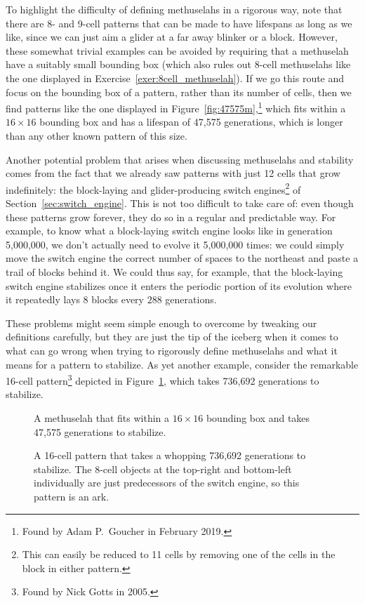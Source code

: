 To highlight the difficulty of defining methuselahs in a rigorous way, note that there are 8- and 9-cell patterns that can be made to have lifespans as long as we like, since we can just aim a glider at a far away blinker or a block. However, these somewhat trivial examples can be avoided by requiring that a methuselah have a suitably small bounding box (which also rules out $8$-cell methuselahs like the one displayed in Exercise~\ref{exer:8cell_methuselah}). If we go this route and focus on the bounding box of a pattern, rather than its number of cells, then we find patterns like the one displayed in Figure~\ref{fig:47575m},\footnote{Found by Adam P.~Goucher in February 2019.} which fits within a $16 \times 16$ bounding box and has a lifespan of 47,575 generations, which is longer than any other known pattern of this size.

Another potential problem that arises when discussing methuselahs and stability comes from the fact that we already saw patterns with just 12 cells that grow indefinitely: the block-laying and glider-producing switch engines\footnote{This can easily be reduced to 11 cells by removing one of the cells in the block in either pattern.} of Section~\ref{sec:switch_engine}. This is not too difficult to take care of: even though these patterns grow forever, they do so in a regular and predictable way. For example, to know what a block-laying switch engine looks like in generation 5,000,000, we don't actually need to evolve it 5,000,000 times: we could simply move the switch engine the correct number of spaces to the northeast and paste a trail of blocks behind it. We could thus say, for example, that the block-laying switch engine stabilizes once it enters the periodic portion of its evolution where it repeatedly lays $8$ blocks every $288$ generations.

These problems might seem simple enough to overcome by tweaking our definitions carefully, but they are just the tip of the iceberg when it comes to what can go wrong when trying to rigorously define methuselahs and what it means for a pattern to stabilize. As yet another example, consider the remarkable 16-cell pattern\footnote{Found by Nick Gotts in 2005.} depicted in Figure~\ref{fig:ark_736692}, which takes 736,692 generations to stabilize.

\begin{figure}[!htb]
	\centering
	\begin{minipage}[b]{0.4\textwidth}
		\centering{}
		\caption{A methuselah that fits within a $16 \times 16$ bounding box and takes 47,575 generations to stabilize.}\label{fig:47575m}
	\end{minipage}\hfill
	\begin{minipage}[b]{0.56\textwidth}
		\centering{}
		\caption{A 16-cell pattern that takes a whopping 736,692 generations to stabilize. The $8$-cell objects at the top-right and bottom-left individually are just predecessors of the switch engine, so this pattern is an ark.}\label{fig:ark_736692}
	\end{minipage}
\end{figure}


